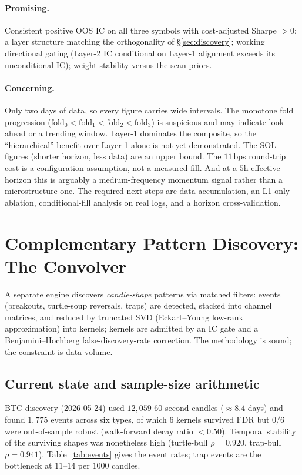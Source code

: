 \documentclass[11pt]{article}
\newcommand{\ic}{\textnormal{IC}}
\begin{document}
\paragraph{Promising.} Consistent positive OOS \ic{} on all three symbols with
cost-adjusted Sharpe $> 0$; a layer structure matching the orthogonality of
\S\ref{sec:discovery}; working directional gating (Layer-2 \ic{} conditional on Layer-1
alignment exceeds its unconditional \ic); weight stability versus the scan priors.

\paragraph{Concerning.} Only two days of data, so every figure carries wide intervals. The
monotone fold progression ($\text{fold}_0 < \text{fold}_1 < \text{fold}_2 < \text{fold}_3$)
is suspicious and may indicate look-ahead or a trending window. Layer-1 dominates the
composite, so the ``hierarchical'' benefit over Layer-1 alone is not yet demonstrated. The
SOL figures (shorter horizon, less data) are an upper bound. The $11$\,bps round-trip cost
is a configuration assumption, not a measured fill. And at a $5$h effective horizon this is
arguably a medium-frequency momentum signal rather than a microstructure one. The required
next steps are data accumulation, an L1-only ablation, conditional-fill analysis on real
logs, and a horizon cross-validation.

\section{Complementary Pattern Discovery: The Convolver}\label{sec:convolver}

A separate engine discovers \emph{candle-shape} patterns via matched filters: events
(breakouts, turtle-soup reversals, traps) are detected, stacked into channel matrices, and
reduced by truncated SVD (Eckart--Young low-rank approximation) into kernels; kernels are
admitted by an \ic{} gate and a Benjamini--Hochberg false-discovery-rate correction. The
methodology is sound; the constraint is data volume.

\subsection{Current state and sample-size arithmetic}
BTC discovery (2026-05-24) used $12{,}059$ $60$-second candles ($\approx 8.4$ days) and
found $1{,}775$ events across six types, of which $6$ kernels survived FDR but
$0/6$ were out-of-sample robust (walk-forward decay ratio $< 0.50$). Temporal stability of
the surviving shapes was nonetheless high (turtle-bull $\rho = 0.920$, trap-bull
$\rho = 0.941$). Table~\ref{tab:events} gives the event rates; trap events are the
bottleneck at $11$--$14$ per $1000$ candles.
\end{document}
